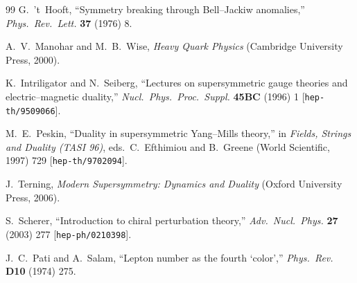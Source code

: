 \documentclass[11pt,a4paper]{article}
\begin{document}
\begin{thebibliography}{99}
  G.~'t~Hooft,
  ``Symmetry breaking through Bell--Jackiw anomalies,''
  \textit{Phys.~Rev.~Lett.} \textbf{37} (1976) 8.

  A.~V.~Manohar and M.~B.~Wise,
  \textit{Heavy Quark Physics}
  (Cambridge University Press, 2000).

  K.~Intriligator and N.~Seiberg,
  ``Lectures on supersymmetric gauge theories and electric--magnetic
  duality,''
  \textit{Nucl.~Phys.~Proc.~Suppl.} \textbf{45BC} (1996) 1
  [\texttt{hep-th/9509066}].

  M.~E.~Peskin,
  ``Duality in supersymmetric Yang--Mills theory,''
  in \textit{Fields, Strings and Duality (TASI 96)},
  eds.\ C.~Efthimiou and B.~Greene (World Scientific, 1997) 729
  [\texttt{hep-th/9702094}].

  J.~Terning,
  \textit{Modern Supersymmetry: Dynamics and Duality}
  (Oxford University Press, 2006).

  S.~Scherer,
  ``Introduction to chiral perturbation theory,''
  \textit{Adv.~Nucl.~Phys.} \textbf{27} (2003) 277
  [\texttt{hep-ph/0210398}].

  J.~C.~Pati and A.~Salam,
  ``Lepton number as the fourth `color',''
  \textit{Phys.~Rev.} \textbf{D10} (1974) 275.

\end{thebibliography}
\end{document}
